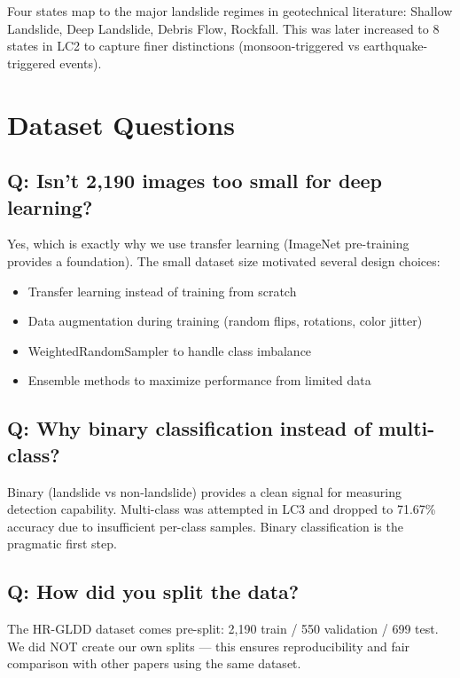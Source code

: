 \documentclass[11pt]{article}
\begin{document}
Four states map to the major landslide regimes in geotechnical literature: Shallow Landslide, Deep Landslide, Debris Flow, Rockfall. This was later increased to 8 states in LC2 to capture finer distinctions (monsoon-triggered vs earthquake-triggered events).

\section{Dataset Questions}

\subsection{Q: Isn't 2,190 images too small for deep learning?}

Yes, which is exactly why we use transfer learning (ImageNet pre-training provides a foundation). The small dataset size motivated several design choices:
\begin{itemize}[noitemsep]
    \item Transfer learning instead of training from scratch
    \item Data augmentation during training (random flips, rotations, color jitter)
    \item WeightedRandomSampler to handle class imbalance
    \item Ensemble methods to maximize performance from limited data
\end{itemize}

\subsection{Q: Why binary classification instead of multi-class?}

Binary (landslide vs non-landslide) provides a clean signal for measuring detection capability. Multi-class was attempted in LC3 and dropped to 71.67\% accuracy due to insufficient per-class samples. Binary classification is the pragmatic first step.

\subsection{Q: How did you split the data?}

The HR-GLDD dataset comes pre-split: 2,190 train / 550 validation / 699 test. We did NOT create our own splits --- this ensures reproducibility and fair comparison with other papers using the same dataset.
\end{document}
